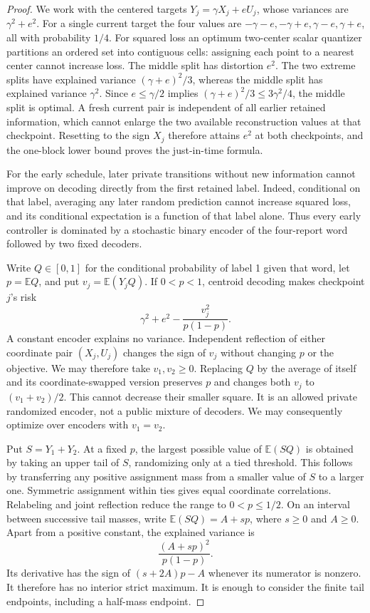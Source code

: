 \begin{proof}
We work with the centered targets
$Y_j=\gamma X_j+eU_j$, whose variances are $\gamma^2+e^2$.
For a single current target the four values are
$-\gamma-e,-\gamma+e,\gamma-e,\gamma+e$, all with probability $1/4$.
For squared loss an optimum two-center scalar quantizer partitions an
ordered set into contiguous cells: assigning each point to a nearest
center cannot increase loss. The middle split has distortion $e^2$.
The two extreme splits have explained variance $(\gamma+e)^2/3$, whereas
the middle split has explained variance $\gamma^2$. Since
$e\le \gamma/2$ implies $(\gamma+e)^2/3\le3\gamma^2/4$, the middle split is
optimal. A fresh current pair is independent of all earlier retained
information, which cannot enlarge the two available reconstruction
values at that checkpoint. Resetting to the sign $X_j$ therefore attains
$e^2$ at both checkpoints, and the one-block lower bound proves the
just-in-time formula.

For the early schedule, later private transitions without new information
cannot improve on decoding directly from the first retained label.
Indeed, conditional on that label, averaging any later random prediction
cannot increase squared loss, and its conditional expectation is a
function of that label alone. Thus every early controller is dominated
by a stochastic binary encoder of the four-report word followed by two
fixed decoders.

Write $Q\in[0,1]$ for the conditional probability of label 1 given that
word, let $p=\mathbb E Q$, and put $v_j=\mathbb E(Y_jQ)$. If
$0<p<1$, centroid decoding makes checkpoint $j$'s risk
\begin{equation}\label{eq:v32-binary-centroid}
 \gamma^2+e^2-\frac{v_j^2}{p(1-p)}.
\end{equation}
A constant encoder explains no variance. Independent reflection of either
coordinate pair $(X_j,U_j)$ changes the sign of $v_j$ without changing
$p$ or the objective. We may therefore take $v_1,v_2\ge0$.
Replacing $Q$ by the average of itself and its coordinate-swapped version
preserves $p$ and changes both $v_j$ to $(v_1+v_2)/2$. This cannot
decrease their smaller square. It is an allowed private randomized
encoder, not a public mixture of decoders. We may consequently optimize
over encoders with $v_1=v_2$.

Put $S=Y_1+Y_2$. At a fixed $p$, the largest possible value of
$\mathbb E(SQ)$ is obtained by taking an upper tail of $S$, randomizing
only at a tied threshold. This follows by transferring any positive
assignment mass from a smaller value of $S$ to a larger one. Symmetric
assignment within ties gives equal coordinate correlations. Relabeling
and joint reflection reduce the range to $0<p\le1/2$.
On an interval between successive tail masses, write
$\mathbb E(SQ)=A+sp$, where $s\ge0$ and $A\ge0$. Apart from a
positive constant, the explained variance is
\[
                       \frac{(A+sp)^2}{p(1-p)}.
\]
Its derivative has the sign of $(s+2A)p-A$ whenever its numerator is
nonzero. It therefore has no interior strict maximum. It is enough to
consider the finite tail endpoints, including a half-mass endpoint.


\end{proof}
